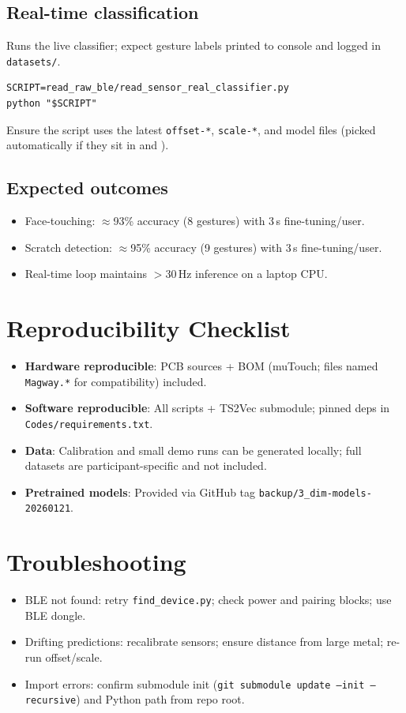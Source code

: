 \documentclass[conference]{IEEEtran}
\begin{document}
\subsection{Real-time classification}
\noindent Runs the live classifier; expect gesture labels printed to console and logged in \texttt{datasets/}.
\begin{verbatim}
SCRIPT=read_raw_ble/read_sensor_real_classifier.py
python "$SCRIPT"
\end{verbatim}
Ensure the script uses the latest \texttt{offset-*}, \texttt{scale-*}, and model files (picked automatically if they sit in  and ).

\subsection{Expected outcomes}
\begin{itemize}
  \item Face-touching: $\approx$93\% accuracy (8 gestures) with 3\,s fine-tuning/user.
  \item Scratch detection: $\approx$95\% accuracy (9 gestures) with 3\,s fine-tuning/user.
  \item Real-time loop maintains $>$30\,Hz inference on a laptop CPU.
\end{itemize}

\section{Reproducibility Checklist}
\begin{itemize}
  \item \textbf{Hardware reproducible}: PCB sources + BOM (muTouch; files named \texttt{Magway.*} for compatibility) included.
  \item \textbf{Software reproducible}: All scripts + TS2Vec submodule; pinned deps in \texttt{Codes/requirements.txt}.
  \item \textbf{Data}: Calibration and small demo runs can be generated locally; full datasets are participant-specific and not included.
  \item \textbf{Pretrained models}: Provided via GitHub tag \texttt{backup/3\_dim-models-20260121}.
\end{itemize}

\section{Troubleshooting}
\begin{itemize}
  \item BLE not found: retry \texttt{find\_device.py}; check power and pairing blocks; use BLE dongle.
  \item Drifting predictions: recalibrate sensors; ensure distance from large metal; re-run offset/scale.
  \item Import errors: confirm submodule init (\texttt{git submodule update --init --recursive}) and Python path from repo root.
\end{itemize}
\end{document}
